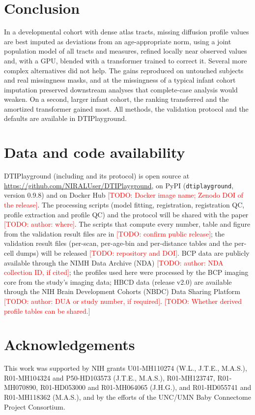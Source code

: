 \documentclass[11pt]{article}
\newcommand{\todo}[1]{\textcolor{red}{[TODO: #1]}}
\begin{document}
\section{Conclusion}

In a developmental cohort with dense atlas tracts, missing diffusion profile values are best imputed as deviations from
an age-appropriate norm, using a joint population model of all tracts and measures, refined locally near observed values
and, with a GPU, blended with a transformer trained to correct it. Several more complex alternatives did not help.
The gains reproduced on untouched subjects and real missingness masks, and at the missingness of a typical infant
cohort imputation preserved downstream analyses that complete-case analysis would weaken. On a second, larger infant cohort, the ranking transferred and the amortized transformer gained most. All methods, the validation protocol and the defaults are available in DTIPlayground.

\section*{Data and code availability}

DTIPlayground (including  and its  protocol) is open source
at \url{https://github.com/NIRALUser/DTIPlayground}, on PyPI (\texttt{dtiplayground}, version 0.9.8) and on Docker Hub
\todo{Docker image name; Zenodo DOI of the release}. The processing scripts (model fitting, registration, registration QC, profile extraction and profile QC) and the
 protocol will be shared with the paper \todo{author: where}. The scripts that compute every number, table and figure from the
validation result files are in  \todo{confirm public release}; the validation
result files (per-scan, per-age-bin and per-distance tables and the per-cell dumps) will be released \todo{repository and
DOI}. BCP data are publicly available through the NIMH Data Archive (NDA) \todo{author: NDA collection ID, if cited}; the profiles
used here were processed by the BCP imaging core from the study's imaging data; HBCD data (release v2.0) are available through the NIH Brain Development Cohorts (NBDC) Data Sharing Platform
\todo{author: DUA or study number, if required}. \todo{Whether
derived profile tables can be shared.}

\section*{Acknowledgements}
This work was supported by NIH grants U01-MH110274 (W.L., J.T.E., M.A.S.), R01-MH104324 and P50-HD103573 (J.T.E.,
M.A.S.), R01-MH123747, R01-MH070890, R01-HD053000 and R01-MH064065 (J.H.G.), and R01-HD055741 and R01-MH118362
(M.A.S.), and by the efforts of the UNC/UMN Baby Connectome Project Consortium.
\end{document}
